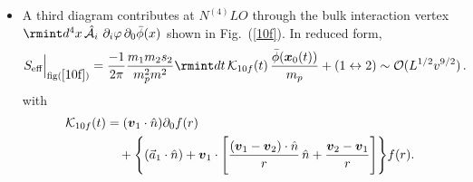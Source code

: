 \begin{itemize}
\begin{align}
    \begin{split}
        \mathcal{K}_{10e}(t)&=\partial_{0}f(r)\,\Delta\boldsymbol{v}\cdot \Hat{n}+f(r)\Bigg\{\Delta\Vec{a}\cdot \Hat{n}
        +\Delta\boldsymbol{v}\cdot
        \Bigg(
        \Hat{n}\frac{(\boldsymbol{v}_1-\boldsymbol{v}_2)\cdot \Hat{n}}{r}
        +\frac{\boldsymbol{v}_2-\boldsymbol{v}_1}{r}
        \Bigg)\Bigg\}.
    \end{split}
\end{align}
where in (\ref{5.29}) the function $f(r)$ is given by,
\begin{align}
    \begin{split}
        f(r)=\frac{e^{-mr}(mr-e^{mr}+1)}{r^2}.
        \label{5.46}
    \end{split}
\end{align}
\vspace{-0.925cm}
\item A third diagram contributes at  $N^{(4)}LO$ through the bulk interaction vertex $\rmint d^4x\,\hat{\mathcal{A}}_i\,\,\partial_i\varphi\,\partial_0\bar{\phi}(x)$ shown in Fig.~(\ref{10f}). In reduced form,
\begin{align}
\begin{split}
S_{\textrm{eff}}\Big |_{\text{fig}(\ref{10f})}
=\frac{-1}{2\pi }\frac{m_1m_2s_2}{m_p^2m^2}\rmint dt\,
\mathcal{K}_{10f}(t)\,
\frac{\Bar{\phi}(\boldsymbol{x}_0(t))}{m_p}  +(1\leftrightarrow 2)\sim\mathcal{O}(L^{1/2}v^{9/2})\,.
\end{split}
\end{align}
with
\begin{align}
\begin{split}
\mathcal{K}_{10f}(t)&=(\boldsymbol{v}_1\cdot \Hat{n}) \partial_0f(r) \\ &
\quad +\Bigg\{
(\Vec{a}_1\cdot \Hat{n})
+\boldsymbol{v}_1\cdot \Bigg[
\frac{(\boldsymbol{v}_1-\boldsymbol{v}_2)\cdot \Hat{n}}{r}\,\Hat{n}
+\frac{\boldsymbol{v}_2-\boldsymbol{v}_1}{r}
\Bigg]
\Bigg\}f(r).
\end{split}
\end{align}




\end{itemize}
